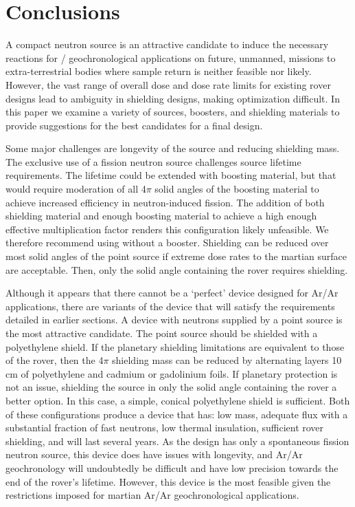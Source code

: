 \documentclass{mc2015}
\begin{document}
\section{Conclusions}
\label{sec:conclusions}

A compact neutron source is an attractive candidate to induce the necessary reactions for  /  geochronological applications on future, unmanned, missions to extra-terrestrial bodies where sample return is neither feasible nor likely. However, the vast range of overall dose and dose rate limits for existing rover designs lead to ambiguity in shielding designs, making optimization difficult. In this paper we examine a variety of sources, boosters, and shielding materials to provide suggestions for the best candidates for a final design.

Some major challenges are longevity of the source and reducing shielding mass. The  exclusive use of a  fission neutron source challenges source lifetime requirements. The lifetime could be extended with boosting material, but that would require moderation of all 4$\pi$ solid angles of the boosting material to achieve increased efficiency in neutron-induced fission. The addition of both shielding material and enough boosting material to achieve a high enough effective multiplication factor renders this configuration likely unfeasible. We therefore recommend using  without a booster. Shielding can be reduced over most solid angles of the point source if extreme dose rates to the martian surface are acceptable. Then, only the solid angle containing the rover requires shielding. 

Although it appears that there cannot be a `perfect' device designed for Ar/Ar applications, there are variants of the device that will satisfy the requirements detailed in earlier sections. A device with neutrons supplied by a  point source is the most attractive candidate. The point source should be shielded with a polyethylene shield. If the planetary shielding limitations are equivalent to those of the rover, then the 4$\pi$ shielding mass can be reduced by alternating layers 10 cm of polyethylene and cadmium or gadolinium foils. If planetary protection is not an issue, shielding the source in only the solid angle containing the rover a better option. In this case, a simple, conical polyethylene shield is sufficient. Both of these configurations produce a device that has: low mass, adequate flux with a substantial fraction of fast neutrons, low thermal insulation, sufficient rover shielding, and will last several years. As the design has only a spontaneous fission neutron source, this device does have issues with longevity, and Ar/Ar geochronology will undoubtedly be difficult and have low precision towards the end of the rover's lifetime. However, this device is the most feasible given the restrictions imposed for martian Ar/Ar geochronological applications. 
 
\end{document}
